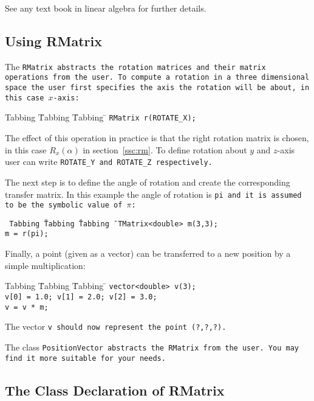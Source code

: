 See any text book in linear algebra for further details.

\subsection{Using RMatrix}

The \tt RMatrix \rm abstracts the rotation matrices and their
matrix operations from the user. To compute a rotation
in a three dimensional space the user first specifies
the axis the rotation will be about, in this case $x$-axis:

\begin{tabbing}
Tabbing \= Tabbing \= Tabbing \= \kill
\>\>\> \tt RMatrix r(ROTATE\_X);
\end{tabbing}

The effect of this operation in practice is that the right rotation matrix 
is chosen, in this case $R_{x}(\alpha)$ in section~\ref{ssc:rm}.
To define rotation about $y$ and $z$-axis user can write 
\tt ROTATE\_Y \rm and \tt ROTATE\_Z \rm respectively. 

The next step is to define the angle of rotation and create the
corresponding transfer matrix. In this example the angle of rotation
is \tt pi \rm and it is assumed to be the symbolic value of $\pi$:

\begin{tabbing}
\tt
Tabbing \= Tabbing \= Tabbing \= \kill
\>\>\>\tt TMatrix<double> m(3,3); \\
\>\>\>\tt  m = r(pi);
\end{tabbing}

Finally, a point (given as a vector) can be transferred 
to a new position by a simple multiplication:

\begin{tabbing}
Tabbing \= Tabbing \= Tabbing \= \kill
\>\>\>\tt vector<double> v(3); \\
\>\>\>\tt v[0] = 1.0; v[1] = 2.0; v[2] = 3.0; \\
\>\>\>\tt v = v * m;
\end{tabbing}

The vector \tt v \rm should now represent the point (?,?,?).

The class  \tt PositionVector \rm  abstracts the \tt RMatrix  \rm from
the user. You may find it more suitable for your needs.

\subsection{The Class Declaration of RMatrix}

